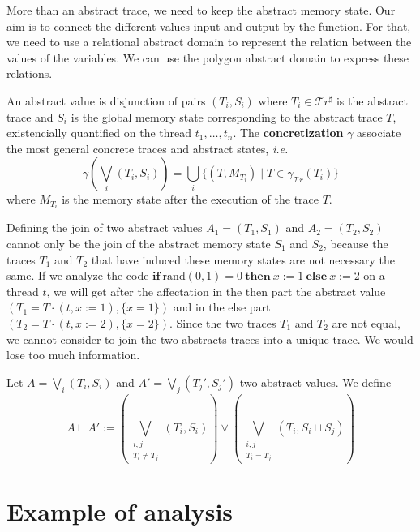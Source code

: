 \documentclass{llncs}
\newcommand{\ifinst}{\mathbf{if}}
\newcommand{\theninst}{\mathbf{then}}
\newcommand{\elseinst}{\mathbf{else}}
\newcommand{\Traces}{\mathcal T\!r}
\newcommand{\aTraces}{\mathcal T\!r^\sharp}
\begin{document}
More than an abstract trace, we need to keep the abstract memory state. Our aim is to connect the different values input and output by the function. For that, we need to use a relational abstract domain to represent the relation between the values of the variables. We can use the polygon abstract domain \cite{DBLP:journals/lisp/Mine06} to express these relations. 



\begin{definition}
	An abstract value is disjunction of pairs $(T_i, S_i)$ where $T_i \in \aTraces$ is the abstract trace and $S_i$ is the global memory state corresponding to the abstract trace $T$, existencially quantified on the thread $t_1, \dots, t_n$. The \textbf{concretization} $\gamma$ associate the most general concrete traces and abstract states, \emph{i.e.}
	\[\gamma\left(\bigvee_i (T_i, S_i)\right) = \bigcup_i \{ (T, M_{T_i}) \mid T\in\gamma_{\Traces}(T_i) \}\]
	where $M_{T_i}$ is the memory state after the execution of the trace $T$. 
\end{definition}





Defining the join of two abstract values $A_1 = (T_1, S_1)$ and $A_2 = (T_2, S_2)$ cannot only be the join of the abstract memory state $S_1$ and $S_2$, because the traces $T_1$ and $T_2$ that have induced these memory states are not necessary the same. If we analyze the code $\ifinst\ \mathrm{rand}(0,1) = 0\ \theninst \ x := 1 \ \elseinst \ x :=2$ on a thread $t$, we will get after the affectation in the then part the abstract value $(T_1 = T \cdot (t, x:=1), \{x = 1\})$ and in the else part $(T_2 = T \cdot (t, x:= 2), \{x = 2\})$. Since the two traces $T_1$ and $T_2$ are not equal, we cannot consider to join the two abstracts traces into a unique trace. We would lose too much information. 


\begin{definition}[Join]
	Let $A = \bigvee_i (T_i, S_i)$ and $A' = \bigvee_j (T_j', S_j')$ two abstract values. We define
	\[A \sqcup A' := \left(\bigvee_{\substack{i,j\\T_i \neq T_j}} (T_i, S_i) \right) \vee \left(\bigvee_{\substack{i,j \\ T_i = T_j}} (T_i, S_i \sqcup S_j) \right)\]
\end{definition}



















\section{Example of analysis}











\end{document}
